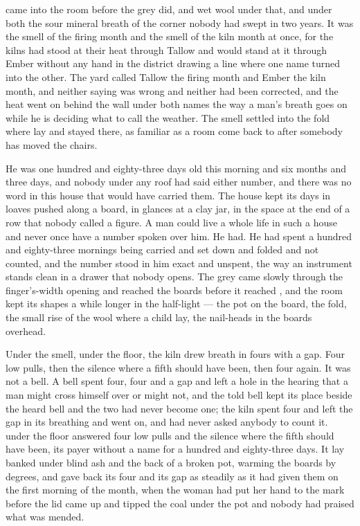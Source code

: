 
 came into the room before the grey did, and wet wool under that, and under both the sour mineral breath of the corner nobody had swept in two years. It was the smell of the firing month and the smell of the kiln month at once, for the kilns had stood at their heat through Tallow and would stand at it through Ember without any hand in the district drawing a line where one name turned into the other. The yard called Tallow the firing month and Ember the kiln month, and neither saying was wrong and neither had been corrected, and the heat went on behind the wall under both names the way a man's breath goes on while he is deciding what to call the weather. The smell settled into the fold where  lay and stayed there, as familiar as a room come back to after somebody has moved the chairs.

He was one hundred and eighty-three days old this morning and six months and three days, and nobody under any roof had said either number, and there was no word in this house that would have carried them. The house kept its days in loaves pushed along a board, in glances at a clay jar, in the space at the end of a row that nobody called a figure. A man could live a whole life in such a house and never once have a number spoken over him. He had. He had spent a hundred and eighty-three mornings being carried and set down and folded and not counted, and the number stood in him exact and unspent, the way an instrument stands clean in a drawer that nobody opens. The grey came slowly through the finger's-width opening and reached the boards before it reached , and the room kept its shapes a while longer in the half-light — the pot on the board, the fold, the small rise of the wool where a child lay, the nail-heads in the boards overhead.

Under the smell, under the floor, the kiln drew breath in fours with a gap. Four low pulls, then the silence where a fifth should have been, then four again. It was not a bell. A bell spent four, four and a gap and left a hole in the hearing that a man might cross himself over or might not, and the told bell kept its place beside the heard bell and the two had never become one; the kiln spent four and left the gap in its breathing and went on, and had never asked anybody to count it.  under the floor answered four low pulls and the silence where the fifth should have been, its payer without a name for a hundred and eighty-three days. It lay banked under blind ash and the back of a broken pot, warming the boards by degrees, and gave back its four and its gap as steadily as it had given them on the first morning of the month, when the woman had put her hand to the mark before the lid came up and tipped the coal under the pot and nobody had praised what was mended.

